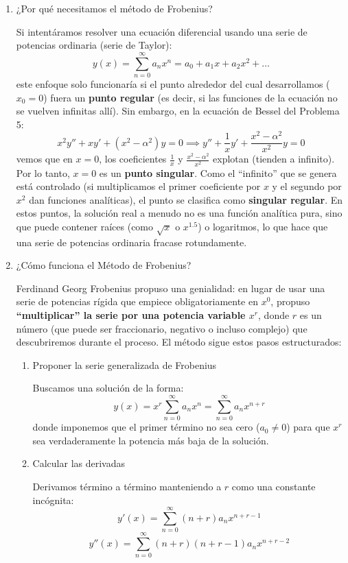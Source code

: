 \documentclass[11pt,spanish]{article}
\begin{document}
\begin{enumerate}
\item ¿Por qué necesitamos el método de Frobenius?

Si intentáramos resolver una ecuación diferencial usando una serie de potencias ordinaria (serie de Taylor):
$$y(x) = \sum_{n=0}^{\infty} a_n x^n = a_0 + a_1 x + a_2 x^2 + \dots$$
este enfoque solo funcionaría si el punto alrededor del cual desarrollamos ($x_0 = 0$) fuera un {\bf punto regular} (es decir, si las funciones de la ecuación no se vuelven infinitas allí).
Sin embargo, en la ecuación de Bessel del Problema 5:
$$x^2 y'' + x y' + (x^2 - \alpha^2)y = 0 \implies y'' + \frac{1}{x} y' + \frac{x^2 - \alpha^2}{x^2} y = 0$$
vemos que en $x = 0$, los coeficientes $\frac{1}{x}$ y $\frac{x^2-\alpha^2}{x^2}$ explotan (tienden a infinito). Por lo tanto, $x=0$ es un {\bf punto singular}.
Como el ``infinito'' que se genera está controlado (si multiplicamos el primer coeficiente por $x$ y el segundo por $x^2$ dan funciones analíticas), el punto se clasifica como {\bf singular regular}. En estos puntos, la solución real a menudo no es una función analítica pura, sino que puede contener raíces (como $\sqrt{x}$ o $x^{1.5}$) o logaritmos, lo que hace que una serie de potencias ordinaria fracase rotundamente.

\item ¿Cómo funciona el Método de Frobenius?

Ferdinand Georg Frobenius propuso una genialidad: en lugar de usar una serie de potencias rígida que empiece obligatoriamente en $x^0$, propuso {\bf ``multiplicar'' la serie por una potencia variable $x^r$}, donde $r$ es un número (que puede ser fraccionario, negativo o incluso complejo) que descubriremos durante el proceso.
El método sigue estos pasos estructurados:

\begin{enumerate}
\item Proponer la serie generalizada de Frobenius

Buscamos una solución de la forma:
$$y(x) = x^r \sum_{n=0}^{\infty} a_n x^n = \sum_{n=0}^{\infty} a_n x^{n+r}$$
donde imponemos que el primer término no sea cero ($a_0 \neq 0$) para que $x^r$ sea verdaderamente la potencia más baja de la solución.

\item Calcular las derivadas

Derivamos término a término manteniendo a $r$ como una constante incógnita:
$$
y'(x) = \sum_{n=0}^{\infty} (n+r) a_n x^{n+r-1}
$$
$$
y''(x) = \sum_{n=0}^{\infty} (n+r)(n+r-1) a_n x^{n+r-2}
$$


\end{enumerate}
\end{enumerate}
\end{document}
